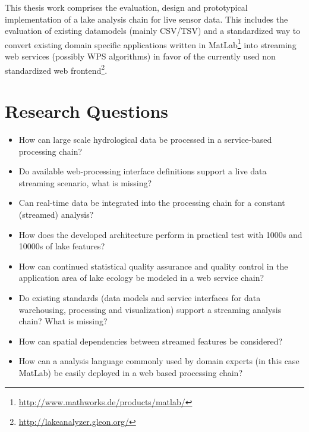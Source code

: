 \documentclass[paper=a4,fontsize=11pt]{scrartcl}
\newcommand{\fu}[1]{\footnote{\url{#1}}}
\begin{document}
    This thesis work comprises the evaluation, design and prototypical implementation of a lake analysis chain for live sensor data.
    This includes the evaluation of existing datamodels (mainly CSV/TSV) and a standardized way to convert existing domain specific applications written in MatLab\fu{http://www.mathworks.de/products/matlab/} into streaming web services (possibly WPS algorithms) in favor of the currently used non standardized web frontend\fu{http://lakeanalyzer.gleon.org/}.

    \section*{Research Questions}
    \begin{itemize}
        \item How can large scale hydrological data be processed in a service-based processing chain?
        \item Do available web-processing interface definitions support a live data streaming scenario, what is missing?
        \item Can real-time data be integrated into the processing chain for a constant (streamed) analysis?
        \item How does the developed architecture perform in practical test with 1000s and 10000s of lake features?
        \item How can continued statistical quality assurance and quality control in the application area of lake ecology be modeled in a web service chain?
        \item Do existing standards (data models and service interfaces for data warehousing, processing and visualization) support a streaming analysis chain? What is missing?
        \item How can spatial dependencies between streamed features be considered?
        \item How can a analysis language commonly used by domain experts (in this case MatLab) be easily deployed in a web based processing chain?
    \end{itemize}
\end{document}
